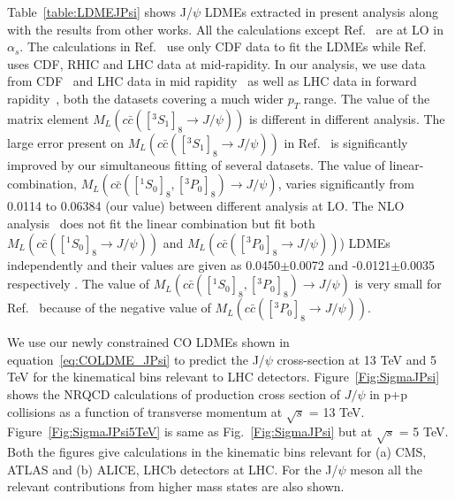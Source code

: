 \documentclass[12pt,a4paper,final]{iopart}
\newcommand{\barc}{{\bar{c}}}
\begin{document}
Table~\ref{table:LDMEJPsi} shows J/$\psi$ LDMEs extracted in present analysis along with the results from other 
works. All the calculations except Ref.~\cite{Butenschoen:2010rq} are at LO in $\alpha_{s}$. 
The calculations in Ref.~\cite{Cho:1995vh,Braaten:1999qk,Beneke:1996yw} 
use only CDF data to fit the LDMEs while Ref.~\cite{Sharma:2012dy} uses CDF, RHIC and LHC data at mid-rapidity. 
In our analysis, we use data from CDF~\cite{Abe:1997jz,Acosta:2004yw} and LHC data in mid rapidity~\cite{Chatrchyan:2011kc,Khachatryan:2015rra,Aad:2015duc} 
as well as LHC data in forward rapidity~\cite{Aaij:2011jh,Aaij:2015rla}, both the datasets covering a much wider $p_T$ range.
The value of the matrix element $M_{L}(c\barc([^3S_1]_{8}\rightarrow J/\psi))$ is different in different analysis.
The large error present on $M_{L}(c\barc([^3S_1]_{8}\rightarrow J/\psi))$ in Ref.~\cite{Sharma:2012dy} is significantly improved by our 
simultaneous fitting of several datasets. The value of linear-combination, 
$M_{L}(c\barc([^1S_0]_{8},[^3P_0]_{8})\rightarrow J/\psi)$, varies significantly from 0.0114 to 
0.06384 (our value) between different analysis at LO. The NLO analysis~\cite{Butenschoen:2010rq} does not fit the linear combination but
fit both $M_{L}(c\barc([^1S_0]_{8}\rightarrow J/\psi))$ and $M_{L}(c\barc([^3P_0]_{8}\rightarrow J/\psi))$) 
LDMEs independently and their values are given as 0.0450$\pm$0.0072 and -0.0121$\pm$0.0035 respectively . The value of $M_{L}(c\barc([^1S_0]_{8},[^3P_0]_{8})\rightarrow J/\psi)$
is very small for Ref.~\cite{Butenschoen:2010rq} because of the negative value of $M_{L}(c\barc([^3P_0]_{8}\rightarrow J/\psi))$.     




 We use our newly constrained CO LDMEs shown in equation~\ref{eq:COLDME_JPsi} to 
predict the J/$\psi$ cross-section at 13 TeV and 5 TeV for the kinematical 
bins relevant to LHC detectors.     
  Figure~\ref{Fig:SigmaJPsi} shows the NRQCD 
calculations of production cross section of $J/\psi$ in p+p collisions  
as a function of transverse momentum at $\sqrt{s}$ = 13 TeV. 
Figure~\ref{Fig:SigmaJPsi5TeV} is same as Fig.~\ref{Fig:SigmaJPsi} but at 
$\sqrt{s}$ = 5 TeV. 
 Both the figures give calculations in the kinematic bins relevant for (a) CMS, ATLAS and 
(b) ALICE, LHCb detectors at LHC. For the J/$\psi$ meson all the relevant contributions 
from higher mass states are also shown. 
\end{document}
